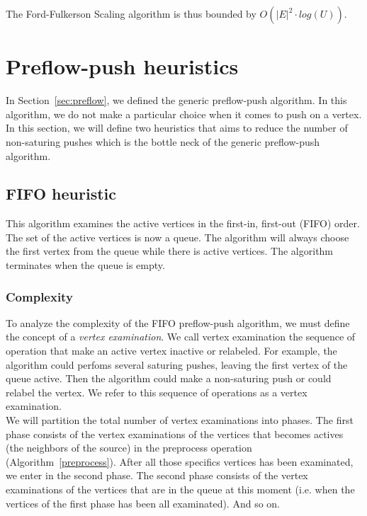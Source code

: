 The Ford-Fulkerson Scaling algorithm is thus bounded by $O(|E|^2 \cdot log(U))$.

\section{Preflow-push heuristics}

In Section~\ref{sec:preflow}, we defined the generic preflow-push algorithm. In this algorithm, we do not make a particular choice when it comes to push on a vertex. In this section, we will define two heuristics that aims to reduce the number of non-saturing pushes which is the bottle neck of the generic preflow-push algorithm.

\subsection{FIFO heuristic}

This algorithm examines the active vertices in the first-in, first-out (FIFO) order. The set of the active vertices is now a queue. The algorithm will always choose the first vertex from the queue while there is active vertices. The algorithm terminates when the queue is empty. 

\subsubsection{Complexity}

To analyze the complexity of the FIFO preflow-push algorithm, we must define the concept of a \textit{vertex examination}. We call vertex examination the sequence of operation that make an active vertex inactive or relabeled. For example, the algorithm could perfoms several saturing pushes, leaving the first vertex of the queue active. Then the algorithm could make a non-saturing push or could relabel the vertex. We refer to this sequence of operations as a vertex examination.\\

We will partition the total number of vertex examinations into phases. The first phase consists of the vertex examinations of the vertices that becomes actives (the neighbors of the source) in the preprocess operation (Algorithm~\ref{preprocess}). After all those specifics vertices has been examinated, we enter in the second phase. The second phase consists of the vertex examinations of the vertices that are in the queue at this moment (i.e. when the vertices of the first phase has been all examinated). And so on.\\

